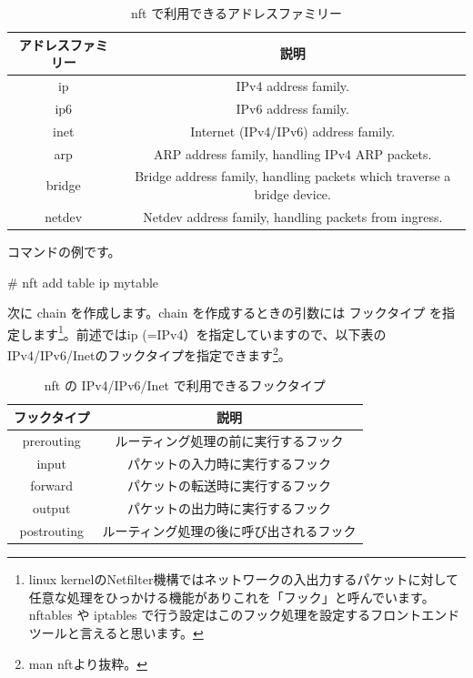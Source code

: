 \documentclass[mingoth,a4paper]{jsarticle}
\begin{document}
\begin{table}[htb]
  \begin{center}
  \caption{nft で利用できるアドレスファミリー} 
  \begin{tabular}{|c|c|}
    \hline
    アドレスファミリー & 説明 \\ \hline
    ip & IPv4 address family. \\ \hline
    ip6 & IPv6 address family. \\ \hline
    inet & Internet (IPv4/IPv6) address family. \\ \hline
    arp & ARP address family, handling IPv4 ARP packets. \\ \hline
    bridge & Bridge address family, handling packets which traverse a bridge device. \\ \hline
    netdev & Netdev address family, handling packets from ingress. \\ \hline
  \end{tabular}
  \end{center}
\end{table}


コマンドの例です。

\begin{commandline}
# nft add table ip mytable
\end{commandline}



次に chain を作成します。chain を作成するときの引数には フックタイプ を指定します\footnote{linux kernelのNetfilter機構ではネットワークの入出力するパケットに対して任意な処理をひっかける機能がありこれを「フック」と呼んでいます。nftables や iptables で行う設定はこのフック処理を設定するフロントエンドツールと言えると思います。}。前述ではip (=IPv4）を指定していますので、以下表のIPv4/IPv6/Inetのフックタイプを指定できます\footnote{man nftより抜粋。}。

\begin{table}[htb]
  \begin{center}
  \caption{nft の IPv4/IPv6/Inet で利用できるフックタイプ} 
  \begin{tabular}{|c|c|}
    \hline
    フックタイプ & 説明 \\ \hline
    prerouting & ルーティング処理の前に実行するフック \\ \hline
    input & パケットの入力時に実行するフック \\ \hline
    forward & パケットの転送時に実行するフック \\ \hline
    output & パケットの出力時に実行するフック \\ \hline
    postrouting & ルーティング処理の後に呼び出されるフック \\ \hline
  \end{tabular}
  \end{center}
\end{table}
\end{document}
